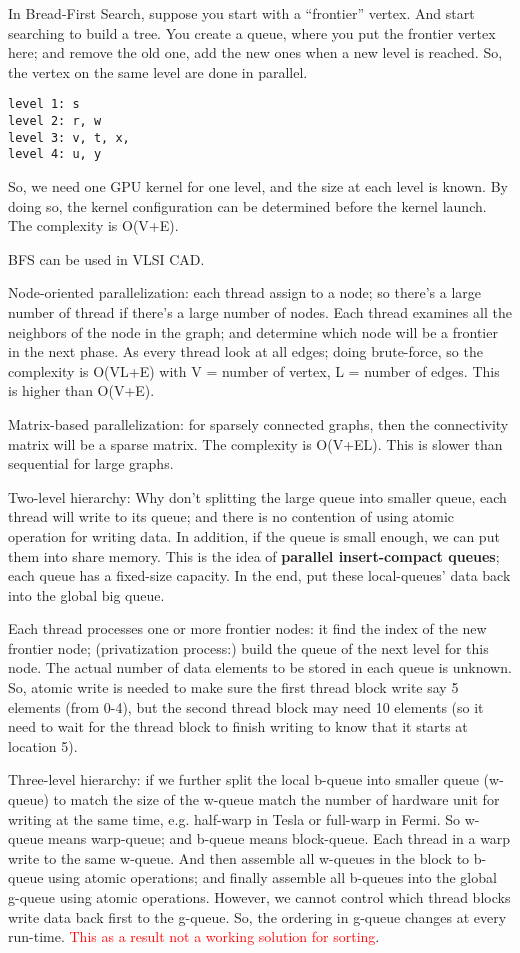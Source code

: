 In Bread-First Search, suppose you start with a ``frontier''
vertex. And start searching to build a tree. You create a queue, where
you put the frontier vertex here; and remove the old one, add the new
ones when a new level is reached. So, the vertex on the same level are
done in parallel. 
\begin{verbatim}
level 1: s
level 2: r, w
level 3: v, t, x, 
level 4: u, y
\end{verbatim}
So, we need one GPU kernel for one level, and the size at each level
is known. By doing so, the  kernel configuration can be determined
before the kernel launch. The complexity is O(V+E).

BFS can be used in VLSI CAD.



Node-oriented parallelization: each thread assign to a node; so
there's a large number of thread if there's a large number of
nodes. Each thread examines all the neighbors of the node in the
graph; and determine which node will be a frontier in the next
phase. As every thread look at all edges; doing brute-force, so the
complexity is O(VL+E) with V = number of vertex, L = number of
edges. This is higher than O(V+E).


Matrix-based parallelization: for sparsely connected graphs, then the
connectivity matrix will be a sparse matrix. The complexity is
O(V+EL). This is slower than sequential for large graphs. 


Two-level hierarchy: Why don't splitting the large queue into smaller
queue, each thread will write to its queue; and there is no contention
of using atomic operation for writing data. In addition, if the queue
is small enough, we can put them into share memory. This is the idea
of {\bf parallel insert-compact queues}; each queue has a fixed-size
capacity. In the end, put these local-queues' data back into the
global big queue.

Each thread processes one or more frontier nodes: it find the index of
the new frontier node; (privatization process:) build the queue of the
next level for this node. The actual number of data elements to be
stored in each queue is unknown. So, atomic write is needed to make
sure the first thread block write say 5 elements (from 0-4), but the
second thread block may need 10 elements (so it need to wait for the
thread block to finish writing to know that it starts at location 5). 


Three-level hierarchy: if we further split the local b-queue into
smaller queue (w-queue) to match the size of the w-queue match the
number of hardware unit for writing at the same time, e.g. half-warp
in Tesla or full-warp in Fermi. So w-queue means warp-queue; and
b-queue means block-queue. Each thread in a warp write to the same
w-queue. And then assemble all w-queues in the block to b-queue using
atomic operations; and finally assemble all b-queues into the global
g-queue using atomic operations. However, we cannot control which
thread blocks write data back first to the g-queue. So, the ordering
in g-queue changes at every run-time.
\textcolor{red}{This as a result not a working solution for sorting}.


